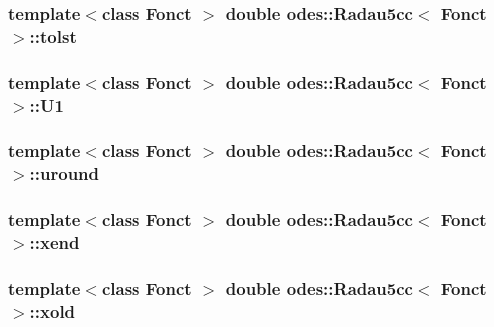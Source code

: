 \subsubsection[{tolst}]{\setlength{\rightskip}{0pt plus 5cm}template$<$class Fonct $>$ double {\bf odes\+::\+Radau5cc}$<$ Fonct $>$\+::tolst\hspace{0.3cm}{\ttfamily [private]}}\label{classodes_1_1Radau5cc_abdf9186a294f8720b8d5100335b6e39a}
\hypertarget{classodes_1_1Radau5cc_ae23acdd71ce8640aa40e111b4df06922}{}
\subsubsection[{U1}]{\setlength{\rightskip}{0pt plus 5cm}template$<$class Fonct $>$ double {\bf odes\+::\+Radau5cc}$<$ Fonct $>$\+::U1\hspace{0.3cm}{\ttfamily [private]}}\label{classodes_1_1Radau5cc_ae23acdd71ce8640aa40e111b4df06922}
\hypertarget{classodes_1_1Radau5cc_aecb9b0f5b18f8bb94a14435e20bdd65b}{}
\subsubsection[{uround}]{\setlength{\rightskip}{0pt plus 5cm}template$<$class Fonct $>$ double {\bf odes\+::\+Radau5cc}$<$ Fonct $>$\+::uround\hspace{0.3cm}{\ttfamily [private]}}\label{classodes_1_1Radau5cc_aecb9b0f5b18f8bb94a14435e20bdd65b}
\hypertarget{classodes_1_1Radau5cc_ac6e95e640106e403c36b260fa97d1bb6}{}
\subsubsection[{xend}]{\setlength{\rightskip}{0pt plus 5cm}template$<$class Fonct $>$ double {\bf odes\+::\+Radau5cc}$<$ Fonct $>$\+::xend\hspace{0.3cm}{\ttfamily [private]}}\label{classodes_1_1Radau5cc_ac6e95e640106e403c36b260fa97d1bb6}
\hypertarget{classodes_1_1Radau5cc_a46e492dffaba4f529881e74bda794bbd}{}
\subsubsection[{xold}]{\setlength{\rightskip}{0pt plus 5cm}template$<$class Fonct $>$ double {\bf odes\+::\+Radau5cc}$<$ Fonct $>$\+::xold\hspace{0.3cm}{\ttfamily [private]}}\label{classodes_1_1Radau5cc_a46e492dffaba4f529881e74bda794bbd}
\hypertarget{classodes_1_1Radau5cc_a9f9ba87113cef033764f5282f987a832}{}
